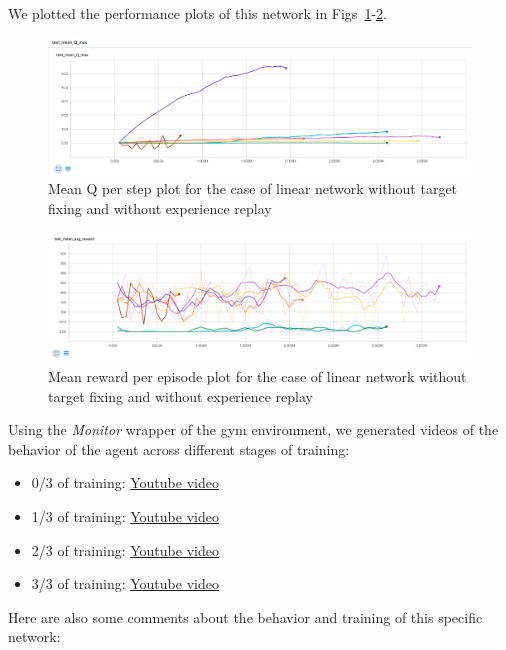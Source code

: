 \documentclass{article}
\begin{document}
We plotted the performance plots of this network in Figs~\ref{fig:q_q2}-\ref{fig:r_q2}.

\begin{figure}[ht] \label{fig:q_q2}
  \centering
  \includegraphics[width=1.0\textwidth]{images/q_linearWithoutStuff}
  \caption{Mean Q per step plot for the case of linear network without target fixing and without experience replay}
\end{figure}

\begin{figure}[ht] \label{fig:r_q2}
  \centering
  \includegraphics[width=1.0\textwidth]{images/r_linearWithoutStuff}
  \caption{Mean reward per episode plot for the case of linear network without target fixing and without experience replay}
\end{figure}

Using the \textit{Monitor} wrapper of the gym environment, we generated videos of the behavior of the agent across different stages of training:

\begin{itemize}
  \item 0/3 of training: \href{http://www.sharelatex.com}{Youtube video}
  \item 1/3 of training: \href{http://www.sharelatex.com}{Youtube video}
  \item 2/3 of training: \href{http://www.sharelatex.com}{Youtube video}
  \item 3/3 of training: \href{http://www.sharelatex.com}{Youtube video}
\end{itemize}

Here are also some comments about the behavior and training of this specific network:
\end{document}
